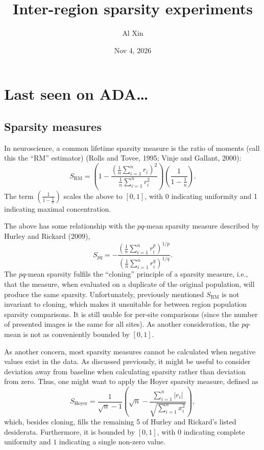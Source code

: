 \documentclass[
  10pt,
  letterpaper,
  DIV=11,
  numbers=noendperiod]{scrartcl}
\title{Inter-region sparsity experiments}
\author{Al Xin}
\date{Nov 4, 2026}
\begin{document}
\maketitle


\section{Last seen on ADA\ldots{}}\label{last-seen-on-ada}

\subsection{Sparsity measures}\label{sparsity-measures}

In neuroscience, a common lifetime sparsity measure is the ratio of
moments (call this the ``RM'' estimator) (Rolls and Tovee, 1995; Vinje
and Gallant, 2000): \[
S_{\textrm{RM}} = \left( 1 - \frac{\left( \frac{1}{n} \sum_{i = 1}^n r_i \right)^2}{\frac{1}{n} \sum_{i = 1}^n r_i^2} \right) \left( \frac{1}{1 - \frac{1}{n}} \right).
\] The term \(\left( \frac{1}{1 - \frac{1}{n}} \right)\) scales the
above to \([0, 1]\), with 0 indicating uniformity and 1 indicating
maximal concentration.

The above has some relationship with the \(pq\)-mean sparsity measure
described by Hurley and Rickard (2009), \[
S_{pq} = - \frac{\left( \frac{1}{n} \sum_{i = 1}^n r_i^p \right)^{1 / p}}{\left( \frac{1}{n} \sum_{i = 1}^n r_i^q \right)^{1/q}}.
\] The \(pq\)-mean sparsity fulfils the ``cloning'' principle of a
sparsity measure, i.e., that the measure, when evaluated on a duplicate
of the original population, will produce the same sparsity.
Unfortunately, previously mentioned \(S_{\textrm{RM}}\) is not invariant
to cloning, which makes it unsuitable for between region population
sparsity comparisons. It is still usable for per-site comparisons (since
the number of presented images is the same for all sites). As another
consideration, the \(pq\)-mean is not as conveniently bounded by
\([0, 1]\).

As another concern, most sparsity measures cannot be calculated when
negative values exist in the data. As discussed previously, it might be
useful to consider deviation away from baseline when calculating
sparsity rather than deviation from zero. Thus, one might want to apply
the Hoyer sparsity measure, defined as \[
S_{\textrm{Hoyer}} = \frac{1}{\sqrt{n} - 1} \left( \sqrt{n} - \frac{\sum_{i = 1}^n |r_i|}{\sqrt{\sum_{i = 1}^n x_i^2}} \right),
\] which, besides cloning, fills the remaining 5 of Hurley and Rickard's
listed desiderata. Furthermore, it is bounded by \([0, 1]\), with \(0\)
indicating complete uniformity and \(1\) indicating a single non-zero
value.
\end{document}
